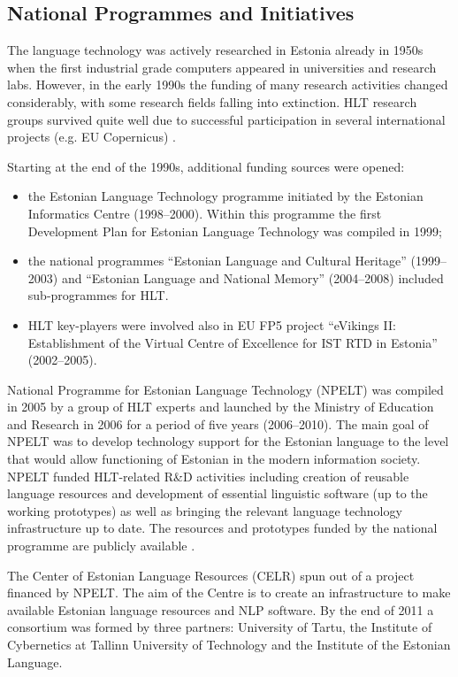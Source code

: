 \begin{multicols}{2}
\subsection{National Programmes and Initiatives}

The language technology was actively researched in Estonia already in 1950s when the first industrial grade computers appeared in universities and research labs. 
However, in the early 1990s the funding of many research activities changed considerably, with some research fields falling into extinction. 
HLT research groups survived quite well due to successful participation in several international projects (e.g. EU Copernicus) \cite{Meisteretal}.

Starting at the end of the 1990s, additional funding sources were opened: 
\begin{itemize}
 \item the Estonian Language Technology programme initiated by the Estonian Informatics Centre (1998--2000). Within this programme the first Development Plan for Estonian Language Technology was compiled in 1999;
 \item the national programmes ``Estonian Language and Cultural
   Heritage'' (1999--2003) and ``Estonian Language and National
   Memory'' (2004--2008) included sub-programmes for HLT. 
 \item HLT key-players were involved also in EU FP5 project ``eVikings II: Establishment of the Virtual Centre of Excellence for IST RTD in Estonia'' (2002--2005).
\end{itemize}

National Programme for Estonian Language Technology (NPELT) was compiled in 2005 by a group of HLT experts and launched by the Ministry of Education and Research in 2006 for a period of five years (2006--2010). 
The main goal of NPELT was to develop technology support for the Estonian language to the level that would allow functioning of Estonian in the modern information society. 
NPELT funded HLT-related R\&D activities including creation of reusable language resources and development of essential linguistic software (up to the working prototypes) as well as bringing the relevant language technology infrastructure up to date. 
The resources and prototypes funded by the national programme are publicly available \cite{ekktt}.

The Center of Estonian Language Resources (CELR) spun out of a project financed by NPELT. The aim of the Centre is to create an infrastructure to make available Estonian language resources and NLP software. By the end of 2011 a consortium was
formed by three partners: University of Tartu, the Institute of Cybernetics at Tallinn University of Technology and the Institute of the Estonian Language.


\end{multicols}
